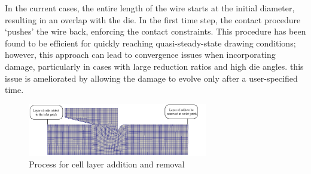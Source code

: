 \documentclass[sn-mathphys,Numbered,draft]{sn-jnl}%
\begin{document}
In the current cases, the entire length of the wire starts at the initial diameter, resulting in an overlap with the die.
In the first time step, the contact procedure `pushes' the wire back, enforcing the contact constraints.
This procedure has been found to be efficient for quickly reaching quasi-steady-state drawing conditions; however,
this approach can lead to convergence issues when incorporating damage, particularly in cases with large reduction ratios and high die angles. %
this issue is ameliorated by allowing the damage to evolve only after a user-specified time.


\begin{figure}[htb]
\begin{center}
	\includegraphics[width=0.7\textwidth]{./Figures/SimulationAndAnalysis/wireMesh_InletOutlet.jpg}
\caption{Process for cell layer addition and removal}
\label{fig:wireInletOutlet}
\end{center}
\end{figure}
\end{document}
